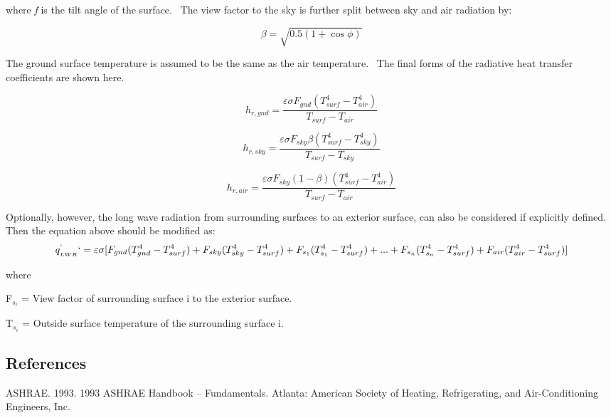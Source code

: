 where \emph{f} is the tilt angle of the surface.~ The view factor to the sky is further split between sky and air radiation by:

\begin{equation}
\beta  = \sqrt {0.5\left( {1 + \cos \phi } \right)}
\end{equation}

The ground surface temperature is assumed to be the same as the air temperature.~ The final forms of the radiative heat transfer coefficients are shown here.

\begin{equation}
{h_{r,gnd}} = \frac{{\varepsilon \sigma {F_{gnd}}(T_{surf}^4 - T_{air}^4)}}{{{T_{surf}} - {T_{air}}}}
\end{equation}

\begin{equation}
{h_{r,sky}} = \frac{{\varepsilon \sigma {F_{sky}}\beta (T_{surf}^4 - T_{sky}^4)}}{{{T_{surf}} - {T_{sky}}}}
\end{equation}

\begin{equation}
{h_{r,air}} = \frac{{\varepsilon \sigma {F_{sky}}\left( {1 - \beta } \right)(T_{surf}^4 - T_{air}^4)}}{{{T_{surf}} - {T_{air}}}}
\end{equation}

Optionally, however, the long wave radiation from surrounding surfaces to an exterior surface, can also be considered if explicitly defined. Then the equation above should be modified as:
\begin{equation}
q_{_{LWR}}^`` = \varepsilon \sigma[{F_{gnd}}(T_{gnd}^4 - T_{surf}^4) + {F_{sky}}(T_{sky}^4 - T_{surf}^4)  + {F_{s_1}}(T_{s_1}^4 - T_{surf}^4)+ ... + {F_{s_n}}(T_{s_n}^4 - T_{surf}^4) +  {F_{air}}(T_{air}^4 - T_{surf}^4)]
\end{equation}

where

F\(_{s_i}\) = View factor of surrounding surface i to the exterior surface.

T\(_{s_i}\) = Outside surface temperature of the surrounding surface i.

\subsection{References}\label{references-034}

ASHRAE. 1993. 1993 ASHRAE Handbook -- Fundamentals. Atlanta: American Society of Heating, Refrigerating, and Air-Conditioning Engineers, Inc.

